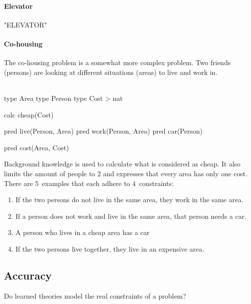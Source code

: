 \paragraph{Elevator}
"ELEVATOR"

\paragraph{Co-housing}
The co-housing problem is a somewhat more complex problem.
Two friends (persons) are looking at different situations (areas) to live and work in.
\\\\
\begin{minipage}{0.5\textwidth}
	\begin{verbatim*}
		type Area
		type Person
		type Cost > nat

		calc cheap(Cost)
	\end{verbatim*}
\end{minipage}
\begin{minipage}{0.5\textwidth}
	\begin{verbatim*}
		pred live(Person, Area)
		pred work(Person, Area)
		pred car(Person)

		pred cost(Area, Cost)
	\end{verbatim*}
\end{minipage}

Background knowledge is used to calculate what is considered as cheap.
It also limits the amount of people to $2$ and expresses that every area has only one cost.
There are $5$~examples that each adhere to $4$~constraints:

\begin{enumerate}
	\item If the two persons do not live in the same area, they work in the same area.
	\item If a person does not work and live in the same area, that person needs a car.
	\item A person who lives in a cheap area has a car
	\item If the two persons live together, they live in an expensive area.
\end{enumerate}

\subsection{Accuracy}

\begin{question}
	Do learned theories model the real constraints of a problem?
\end{question}

